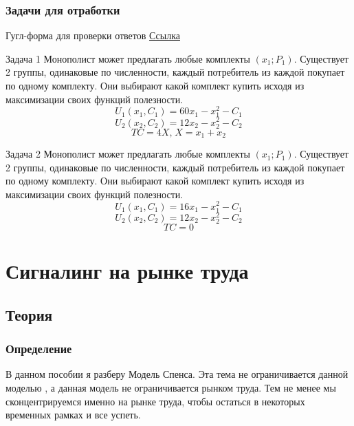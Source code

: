 \subsection{Задачи для отработки}

\begin{mybox}{Гугл-форма для проверки ответов}
    \href{https://forms.gle/Ka76oAsLQDdQsKNR9}{Ссылка}
\end{mybox}

\begin{mybox}{Задача 1}
    Монополист может предлагать любые комплекты $(x_1;P_1)$. Существует 2 группы, одинаковые по численности, каждый
    потребитель из каждой покупает по одному комплекту. Они выбирают какой комплект купить исходя из максимизации своих
    функций полезности. \\
    $$U_1(x_1,C_1)=60x_1-x_1^2-C_1$$
    $$U_2(x_2,C_2)=12x_2-x_2^2-C_2$$
    $$TC=4X\text{,}\;X=x_1+x_2$$
\end{mybox}

\begin{mybox}{Задача 2}
    Монополист может предлагать любые комплекты $(x_1;P_1)$. Существует 2 группы, одинаковые по численности, каждый потребитель из каждой покупает по одному комплекту. Они выбирают какой комплект купить исходя из максимизации своих функций полезности. \\
    $$U_1(x_1,C_1)=16x_1-x_1^2-C_1$$
    $$U_2(x_2,C_2)=12x_2-x_2^2-C_2$$
    $$TC=0$$
\end{mybox}

\newpage



\chapter{Сигналинг на рынке труда}


\section{Теория}

\subsection{Определение}

\indent\setlength{\parindent}{1em}В данном пособии я разберу Модель Спенса. Эта тема не ограничивается данной моделью
, а данная модель не ограничивается рынком труда. Тем не менее мы сконцентрируемся именно на рынке труда, чтобы
остаться в некоторых временных рамках и все успеть. \smallskip\\

